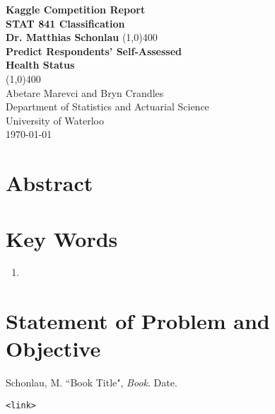 \documentclass[11pt]{article}
\begin{document}
\begin{titlepage}
\begin{center}
\vspace*{1cm}
\Large{\textbf{Kaggle Competition Report}}\\
\Large{\textbf{STAT 841 Classification}}\\
\Large{\textbf{Dr. Matthias Schonlau}}
\vfill
\line(1,0){400}\\[1mm]
\huge{\textbf{Predict Respondents' Self-Assessed}}\\[3mm]
\huge{\textbf{Health Status}}\\[1mm]
\line(1,0){400}\\
\vfill
\Large{Abetare Marevci and Bryn Crandles}\\
\Large{Department of Statistics and Actuarial Science}\\
\Large{University of Waterloo}\\
\today
\end{center}
\end{titlepage}

\tableofcontents
\thispagestyle{empty}
\clearpage
\setcounter{page}{1}

\section{Abstract}


\section{Key Words}

\begin{enumerate}
	\item
\end{enumerate}

\pagebreak 

\section{Statement of Problem and Objective}





\pagebreak

\begin{thebibliography}{}

Schonlau, M. 
``Book Title", 
\textit{Book}. Date.

\texttt{<link>}
	

	
\end{thebibliography}
\end{document}
